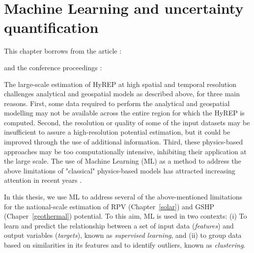 \chapter{Machine Learning and uncertainty quantification}
\label{methods_ML}

\vspace{-45pt} %
\begin{tcolorbox}[enhanced,width=\textwidth,size=fbox,
        sharp corners,colframe=black!5!white,drop fuzzy shadow southeast,
        boxrule=3mm, parbox=false] 
        
This chapter borrows from the article \citep{walch_big_2020}:

\qquad {}

and the conference proceedings \cite{walch_spatio-temporal_2019, walch_fast_2019-1}:

\quad {} 

\quad {}
\end{tcolorbox}

The large-scale estimation of HyREP at high spatial and temporal resolution challenges analytical and geospatial models as described above, for three main reasons.
First, some data required to perform the analytical and geospatial modelling may not be available across the entire region for which the HyREP is computed.
Second, the resolution or quality of some of the input datasets may be insufficient to assure a high-resolution potential estimation, but it could be improved through the use of additional information.
Third, these physics-based approaches may be too computationally intensive, inhibiting their application at the large scale.
The use of Machine Learning (ML) as a method to address the above limitations of "classical" physics-based models has attracted increasing attention in recent years \cite{willard_integrating_2020}. 

In this thesis, we use ML to address several of the above-mentioned limitations for the national-scale estimation of RPV (Chapter~\ref{solar}) and GSHP (Chaper~\ref{geothermal}) potential. 
To this aim, ML is used in two contexts: 
(i) To learn and predict the relationship between a set of input data (\textit{features}) and output variables (\textit{targets}), known as \textit{supervised learning}, 
and (ii) to group data based on similarities in its features and to identify outliers, known as \textit{clustering}. 

